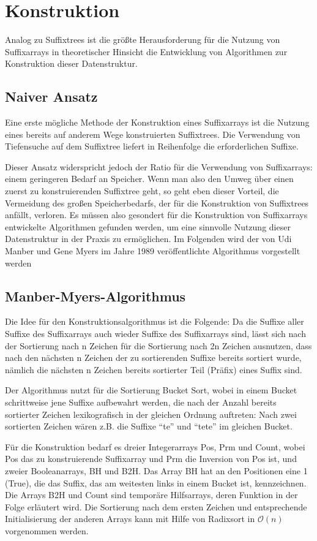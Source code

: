 \documentclass[twoside]{article}
\begin{document}
\section{Konstruktion}
Analog zu Suffixtrees ist die größte Herausforderung für die Nutzung von
Suffixarrays in theoretischer Hinsicht die Entwicklung von Algorithmen zur
Konstruktion dieser Datenstruktur.
\subsection{Naiver Ansatz}
Eine erste mögliche Methode der Konstruktion eines Suffixarrays ist die Nutzung
eines bereits auf anderem Wege konstruierten Suffixtrees. Die Verwendung von
Tiefensuche auf dem Suffixtree liefert in Reihenfolge die erforderlichen Suffixe.

Dieser Ansatz widerspricht jedoch der Ratio für die Verwendung von Suffixarrays:
einem geringeren Bedarf an Speicher.
Wenn man also den Umweg über einen zuerst zu konstruierenden Suffixtree geht, so
geht eben dieser Vorteil, die Vermeidung des großen Speicherbedarfs, der für die
Konstruktion von Suffixtrees anfällt, verloren.
Es müssen also gesondert für die Konstruktion von Suffixarrays entwickelte
Algorithmen gefunden werden, um eine sinnvolle Nutzung dieser Datenstruktur in
der Praxis zu ermöglichen.
Im Folgenden wird der von Udi Manber und Gene Myers im Jahre 1989 veröffentlichte
Algorithmus vorgestellt werden

\subsection{Manber-Myers-Algorithmus}
Die Idee für den Konstruktionsalgorithmus ist die Folgende: Da die Suffixe aller
Suffixe des Suffixarrays auch wieder Suffixe des Suffixarrays sind, lässt sich
nach der Sortierung nach n Zeichen für die Sortierung nach 2n Zeichen ausnutzen,
dass nach den nächsten n Zeichen der zu sortierenden Suffixe bereits sortiert
wurde, nämlich die nächsten n Zeichen bereits sortierter Teil (Präfix) eines Suffix
sind.

Der Algorithmus nutzt für die Sortierung Bucket Sort, wobei in einem Bucket schrittweise
jene Suffixe aufbewahrt werden, die nach der Anzahl bereits sortierter Zeichen
lexikografisch in der gleichen Ordnung auftreten: Nach zwei sortierten Zeichen
wären z.B. die Suffixe "`te"' und "`tete"' im gleichen Bucket.

Für die Konstruktion bedarf es dreier Integerarrays Pos, Prm und Count, wobei Pos das
zu konstruierende Suffixarray und Prm die Inversion von Pos ist, und zweier
Booleanarrays, BH und B2H. Das Array BH hat an den Positionen eine 1 (True), die das Suffix, das
am weitesten links in einem Bucket ist, kennzeichnen. Die Arrays B2H und Count
sind temporäre Hilfsarrays, deren Funktion in der Folge erläutert wird.
Die Sortierung nach dem ersten
Zeichen und entsprechende Initialisierung der anderen Arrays kann mit Hilfe
von Radixsort in $\mathcal{O}(n)$ vorgenommen werden. \\
\end{document}
